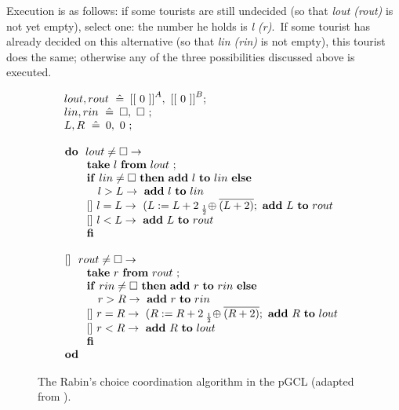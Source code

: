 \documentclass[numbers,copyright,creativecommons]{eptcs}
\newcommand{\Defs}{\mathrel{\hat{=}}}
\newcommand{\bag}[2]{{[[\ #1\ ]]}^{#2}}
\newcommand{\pp}[1]{\mathbin{\makebox[0em]{~}_{#1}\oplus}}
\begin{document}
Execution is as follows: if some tourists are still undecided (so that {\it lout (rout)} is not yet empty), select one:
the number he holds is {\it l (r)}.\ If some tourist has already decided on this alternative (so that {\it lin (rin)} is
not empty), this tourist does the same; otherwise any of the three possibilities discussed above
is executed.

\begin{figure}
\small
\[
\begin{array}{l}
lout, rout \ \Defs \
\hspace*{-1ex}
\ \bag{0}{A},\ \bag{0}{B} ; \\
lin, rin \ \Defs \
\hspace*{-1ex}
\ \square,\ \square \ ; \\
L, R \ \Defs \
\hspace*{-1ex}
\ 0,\ 0 \ ; \\
\\
\hspace*{-1ex}\begin{array}[t]{l}
{\bf do}\ \ lout \neq \square \rightarrow \\

\quad\quad ${\bf take}$ \ l \ ${\bf from}$ \ lout \ ; \\
\quad\quad {\bf if} \ lin \neq \square \ {\bf then} \ {\bf add} \ l \ {\bf to} \ lin \ {\bf else}\\
\quad\quad\quad l > L \rightarrow \ {\bf add} \ l \ {\bf to} \  lin\\
\quad\quad []\ l = L \rightarrow \ (L:= L + 2 \pp{\frac{1}{2}} \overline{(L + 2)} ; \ {\bf add} \ L \ {\bf to} \ rout\\
\quad\quad []\ l < L \rightarrow \ {\bf add} \ L \ {\bf to} \ rout\\
\quad\quad {\bf fi}\\
\\
$[]$ \ \ rout \neq \square \rightarrow \\
\quad\quad ${\bf take}$ \ r \ ${\bf from}$ \ rout \ ; \\
\quad\quad {\bf if} \ rin \neq \square \ {\bf then} \ {\bf add} \ r \ {\bf to} \ rin \ {\bf else}\\
\quad\quad\quad r > R \rightarrow \ {\bf add} \ r \ {\bf to} \  rin\\
\quad\quad []\ r = R \rightarrow \ (R:= R + 2 \pp{\frac{1}{2}} \overline{(R + 2)} ; \ {\bf add} \ R \ {\bf to} \ lout\\
\quad\quad []\ r < R \rightarrow \ {\bf add} \ R \ {\bf to} \ lout\\
\quad\quad {\bf fi}\\
{\bf od}
\end{array}
\end{array}
\]
\caption{\rm The Rabin's choice coordination algorithm in the pGCL (adapted from \cite{ARP}).}\label{fig:DCpGCL}
\end{figure}
\end{document}

